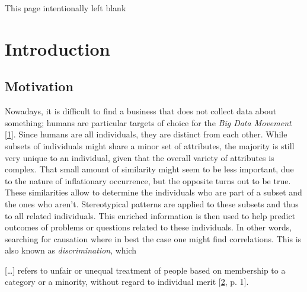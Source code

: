 \documentclass[12pt,english,a4paper,titlepage,cleardoublepage=empty,dottedtoc]{report}
\let\origquote\quote
\let\endorigquote\endquote
\renewenvironment{quote}{%
    \origquote
    \itshape
}
{\endorigquote}
\begin{document}
{
\setcounter{tocdepth}{1}
\pagestyle{plain}
\tableofcontents
}
\newpage
{}
\listoftables
\newpage
{}
\listoffigures
\newpage
\newpage

\begin{center}
\thispagestyle{empty}
\setcounter{page}{0}
This page intentionally left blank
\end{center}\newpage

\chapter{Introduction}\label{introduction}

\section{Motivation}\label{motivation}

Nowadays, it is difficult to find a business that does not collect data
about something; humans are particular targets of choice for the
\emph{Big Data Movement}
{[}\protect\hyperlink{ref-web_2016_privacy-international-about-big-data}{1}{]}.
Since humans are all individuals, they are distinct from each other.
While subsets of individuals might share a minor set of attributes, the
majority is still very unique to an individual, given that the overall
variety of attributes is complex. That small amount of similarity might
seem to be less important, due to the nature of inflationary occurrence,
but the opposite turns out to be true. These similarities allow to
determine the individuals who are part of a subset and the ones who
aren't. Stereotypical patterns are applied to these subsets and thus to
all related individuals. This enriched information is then used to help
predict outcomes of problems or questions related to these individuals.
In other words, searching for causation where in best the case one might
find correlations. This is also known as \emph{discrimination}, which

\begin{quote}
{[}\ldots{}{]} refers to unfair or unequal treatment of people based on
membership to a category or a minority, without regard to individual
merit
{[}\protect\hyperlink{ref-paper_2008_discrimination-aware-data-mining}{2},
p. 1{]}.
\end{quote}
\end{document}
